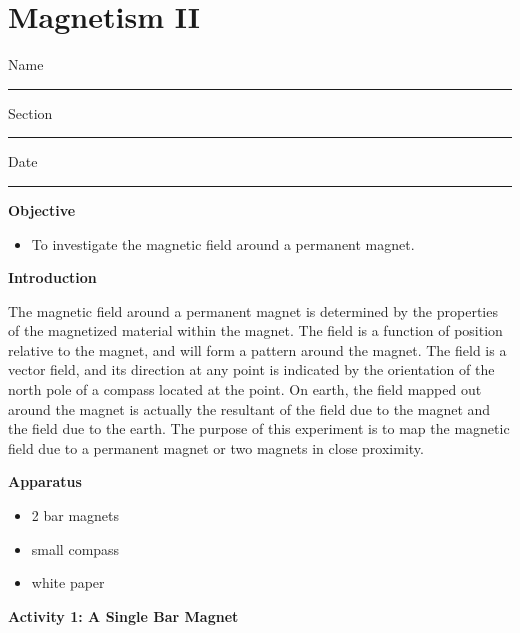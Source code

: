 
\section{Magnetism II}

Name \rule{2.0in}{0.1pt}\hfill{}Section \rule{1.0in}{0.1pt}\hfill{}Date
\rule{1.0in}{0.1pt}

\textbf{Objective}

\begin{itemize}
\item To investigate the magnetic field around a permanent magnet.
\end{itemize}
\textbf{Introduction} 

The magnetic field around a permanent magnet is determined by the properties 
of the magnetized material within the magnet. The field is a function of 
position relative to the magnet, and will form a pattern around the magnet. 
The field is a vector field, and its direction at any point is indicated by 
the orientation of the north pole of a compass located at the point. On earth, 
the field mapped out around the magnet is actually the resultant of the field 
due to the magnet and the field due to the earth. The purpose of this 
experiment is to map the magnetic field due to a permanent magnet or two 
magnets in close proximity.

\textbf{Apparatus}

\begin{itemize}
\item 2 bar magnets 
\item small compass 
\item white paper
\end{itemize}
\textbf{Activity 1: A Single Bar Magnet}

\vspace{0.3cm}
{\centering {} \par}
\vspace{0.3cm}

